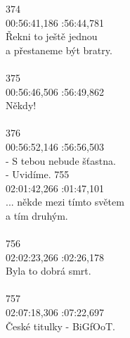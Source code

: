 {
374\\
00:56:41,186 :56:44,781\\
Řekni to ještě jednou\\
a přestaneme být bratry.\\
\\
375\\
00:56:46,506 :56:49,862\\
Někdy!\\
\\
376\\
00:56:52,146 :56:56,503\\
- S tebou nebude šťastna.\\
- Uvidíme.}
{
755\\
02:01:42,266 :01:47,101\\
... někde mezi tímto světem\\
a tím druhým.\\
\\
756\\
02:02:23,266 :02:26,178\\
Byla to dobrá smrt.\\
\\
757\\
02:07:18,306 :07:22,697\\
České titulky - BiGfOoT.}


